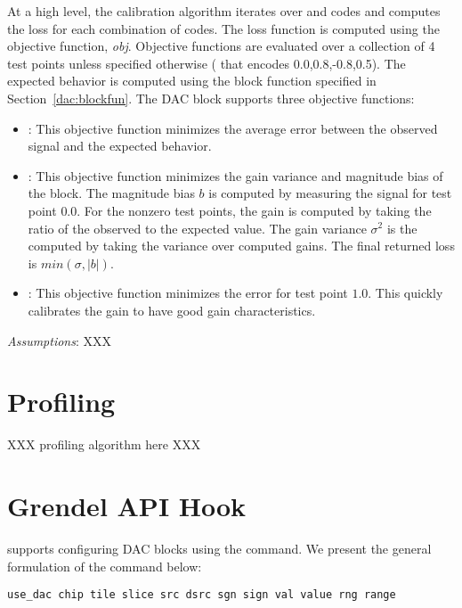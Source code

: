 At a high level, the calibration algorithm iterates over  and
 codes and computes the loss for each combination of codes. The
loss function is computed using the objective function, \textit{obj}. Objective
functions are evaluated over a collection of 4
test points unless specified otherwise ( that encodes
0.0,0.8,-0.8,0.5). The expected behavior is computed using the block function
specified in Section~\ref{dac:blockfun}. The DAC block supports three objective functions:
\begin{itemize}
\item{}: This objective function minimizes the average
  error between the observed signal and the expected behavior. 
\item{}: This objective function minimizes the gain
  variance and magnitude bias of the block. The magnitude bias $b$ is computed
  by measuring the signal for test point $0.0$. For the nonzero test
  points, the gain is computed by taking the ratio of the observed to the
  expected value. The gain variance $\sigma^2$ is the computed by taking the
  variance over computed gains. The final returned loss is $min(\sigma,|b|)$.
  \item{}: This objective function minimizes the error for test
    point $1.0$. This quickly calibrates the gain to have good gain characteristics.
  \end{itemize}

\noindent\textit{Assumptions}: XXX
  
\section{Profiling}

XXX profiling algorithm here XXX

\section{Grendel API Hook}

\grendel supports configuring DAC blocks using the  command. We
present the general formulation of the  command below:

\begin{lstlisting}
use_dac chip tile slice src dsrc sgn sign val value rng range
\end{lstlisting}

